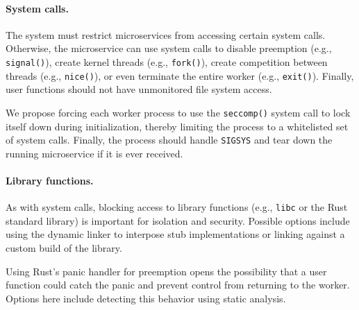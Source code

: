 
\paragraph{System calls.}
The system must restrict microservices from accessing certain system calls.
Otherwise, the microservice can use system calls to disable preemption
(e.g., \texttt{signal()}), create kernel threads (e.g., \texttt{fork()}),
create competition between threads (e.g., \texttt{nice()}), or even terminate
the entire worker (e.g., \texttt{exit()}). Finally, user functions should not
have unmonitored file system access.

We propose forcing each worker process to use the \texttt{seccomp()} system
call\cite{seccomp-manpage}
to lock itself down during initialization, thereby limiting the process to a
whitelisted set of system calls. Finally, the process
should handle \texttt{SIGSYS} and tear down the running microservice if it is
ever received.

\paragraph{Library functions.}
As with system calls, blocking access to library functions (e.g., \texttt{libc}
or the Rust standard library) is important for isolation and security.  Possible
options include using the dynamic linker to interpose stub implementations or
linking against a custom build of the library.

Using Rust's panic handler for preemption opens the possibility that a user
function could catch the panic and prevent control from returning to the
worker. Options here include detecting this behavior using static analysis.

